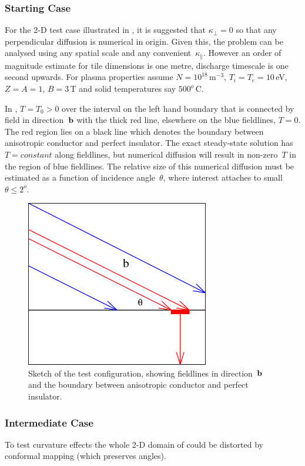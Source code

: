\subsubsection{Starting Case}\label{sec:start}
For the 2-D test case illustrated in , it is suggested that $\kappa_{\perp}=0$
so that any perpendicular diffusion is numerical in origin. Given this,
the problem can be analysed using any spatial scale and any convenient~$\kappa_{\parallel}$.
However an order of magnitude estimate for tile dimensions is one metre,
discharge timescale is one second upwards. For plasma properties
assume $N=10^{18}$\,m$^{-3}$, $T_i=T_e=10$\,eV, $Z=A=1$, $B=3$\,T and solid temperatures say $500^o$\,C.

In , $T=T_0>0$ over the interval on the left hand boundary that is connected by field
in direction~${\bf b}$ with the thick red line,
elsewhere on the blue fieldlines, $T=0$. The red region lies on a black line
which denotes the boundary between anisotropic conductor and  perfect insulator. 
The exact steady-state solution has $T=constant$ along fieldlines, but numerical
diffusion will result in non-zero~$T$ in the region of blue fieldlines.
The relative size of this numerical diffusion must be estimated as a function
of incidence angle~$\theta$, where interest attaches to small $\theta\leq2^o$.
\begin{figure}
\centerline{
\includegraphics[width=8.0cm]{../png/aniso}
}
\caption{Sketch of the test configuration, showing fieldlines in direction~${\bf b}$
and the boundary between anisotropic conductor and perfect insulator.
\label{fig:aniso}}
\end{figure}

\subsubsection{Intermediate Case}\label{sec:intermediate}
To test curvature effects the whole 2-D domain of  could be distorted by conformal mapping
(which preserves angles).

